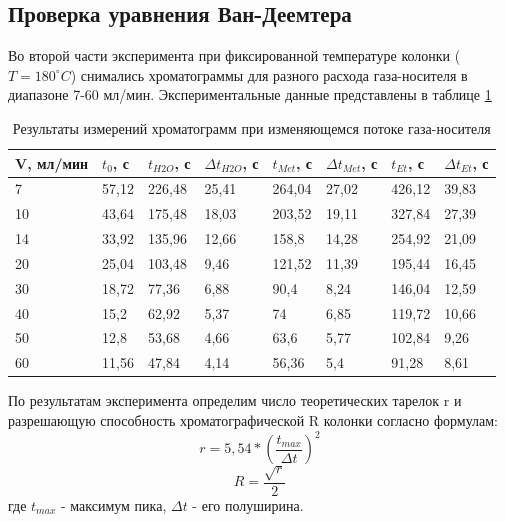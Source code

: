 \documentclass{article}
\begin{document}
\subsection{Проверка уравнения Ван-Деемтера}\;
\par Во второй части эксперимента при фиксированной температуре колонки ($T = 180^{\circ}C$) снимались хроматограммы для разного расхода газа-носителя в диапазоне 7-60 мл/мин. Экспериментальные данные представлены в таблице \ref{tab:table_van}
\begin{table}[h]
\centering
\begin{tabular}{|l|l|l|l|l|l|l|l|}
\hline
V, мл/мин & $t_0$, с & $t_{H2O}$, с & $\Delta t_{H2O}$, с & $t_{Met}$, с & $\Delta t_{Met}$, с & $t_{Et}$, с & $\Delta t_{Et}$, с \\ \hline
7         & 57,12 & 226,48    & 25,41      & 264,04    & 27,02       & 426,12   & 39,83     \\ \hline
10        & 43,64 & 175,48    & 18,03      & 203,52    & 19,11       & 327,84   & 27,39     \\ \hline
14        & 33,92 & 135,96    & 12,66      & 158,8     & 14,28       & 254,92   & 21,09     \\ \hline
20        & 25,04 & 103,48    & 9,46       & 121,52    & 11,39       & 195,44   & 16,45     \\ \hline
30        & 18,72 & 77,36     & 6,88       & 90,4      & 8,24        & 146,04   & 12,59     \\ \hline
40        & 15,2  & 62,92     & 5,37       & 74        & 6,85        & 119,72   & 10,66     \\ \hline
50        & 12,8  & 53,68     & 4,66       & 63,6      & 5,77        & 102,84   & 9,26      \\ \hline
60        & 11,56 & 47,84     & 4,14       & 56,36     & 5,4         & 91,28    & 8,61      \\ \hline
\end{tabular}
\caption{Результаты измерений хроматограмм при изменяющемся потоке газа-носителя}
\label{tab:table_van}
\end{table}

\par По результатам эксперимента определим число теоретических тарелок r и разрешающую способность хроматографической R колонки согласно формулам:
$$r = 5,54*(\frac{t_{max}}{\Delta t})^2$$
$$R = \frac{\sqrt r}{2}$$
 где $t_{max}$ - максимум пика, $\Delta t$ - его полуширина.
 
\end{document}
